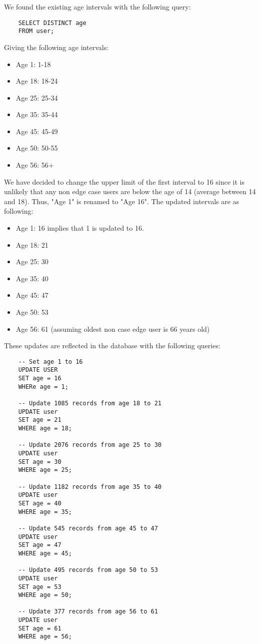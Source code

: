 \newpage

\noindent We found the existing age intervals with the following query: 

\begin{verbatim}
	SELECT DISTINCT age 
	FROM user; 
\end{verbatim}

Giving the following age intervals: 

\begin{itemize}
	\item Age 1: 1-18
	\item Age 18: 18-24
	\item Age 25: 25-34
	\item Age 35: 35-44
	\item Age 45: 45-49
	\item Age 50: 50-55
	\item Age 56: 56+
\end{itemize}

We have decided to change the upper limit of the first interval to 16 since it is unlikely that any non edge case users are below the age of 14 (average between 14 and 18). Thus, "Age 1" is renamed to "Age 16". The updated intervals are as following: 

\begin{itemize}
	\item Age 1: 16 implies that 1 is updated to 16.
	\item Age 18: 21 
	\item Age 25: 30
	\item Age 35: 40
	\item Age 45: 47 
	\item Age 50: 53
	\item Age 56: 61 (assuming oldest non case edge user is 66 years old)
\end{itemize}

These updates are reflected in the database with the following queries: 

\begin{verbatim}
	-- Set age 1 to 16
	UPDATE USER 
	SET age = 16 
	WHERe age = 1; 
	
	-- Update 1085 records from age 18 to 21 
	UPDATE user
	SET age = 21
	WHERE age = 18; 
	
	-- Update 2076 records from age 25 to 30 
	UPDATE user
	SET age = 30
	WHERE age = 25; 
	
	-- Update 1182 records from age 35 to 40 
	UPDATE user
	SET age = 40
	WHERE age = 35; 
	
	-- Update 545 records from age 45 to 47 
	UPDATE user
	SET age = 47
	WHERE age = 45; 
	
	-- Update 495 records from age 50 to 53 
	UPDATE user
	SET age = 53
	WHERE age = 50; 
	
	-- Update 377 records from age 56 to 61 
	UPDATE user
	SET age = 61
	WHERE age = 56; 
\end{verbatim}

